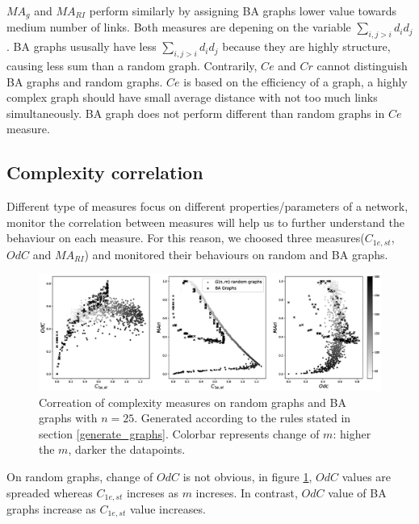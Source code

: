 \documentclass[12pt]{article}
\begin{document}
$MA_g$ and $MA_{RI}$ perform similarly by assigning BA graphs lower value towards medium number of links. Both measures are depening on the variable $\sum_{i,j>i}d_id_j$. BA graphs ususally have less $\sum_{i,j>i}d_id_j$ because they are highly structure, causing less sum than a random graph. Contrarily, $Ce$ and $Cr$ cannot distinguish BA graphs and random graphs. $Ce$ is based on the efficiency of a graph, a highly complex graph should have small average distance with not too much links simultaneously. BA graph does not perform different than random graphs in $Ce$ measure.\\

\subsection{Complexity correlation}
Different type of measures focus on different properties/parameters of a network, monitor the correlation between measures will help us to further understand the behaviour on each measure. For this reason, we choosed three measures($C_{1e,st}$,$OdC$ and $MA_{RI}$) and monitored their behaviours on random and BA graphs.\\
\begin{figure}[ht]
    \label{fig:correlation}
    \centering
    \includegraphics[width = 1.2\textwidth]{complexity_correlation.eps}
    \caption{Correation of complexity measures on random graphs and BA graphs with $n=25$. Generated according to the rules stated in section \ref{generate_graphs}. Colorbar represents change of $m$: higher the $m$, darker the datapoints.}
\end{figure}

\noindent
On random graphs, change of $OdC$ is not obvious, in figure \ref{fig:correlation}, $OdC$ values are spreaded whereas $C_{1e,st}$ increses as $m$ increses. In contrast, $OdC$ value of BA graphs increase as $C_{1e,st}$ value increases. 
\end{document}

